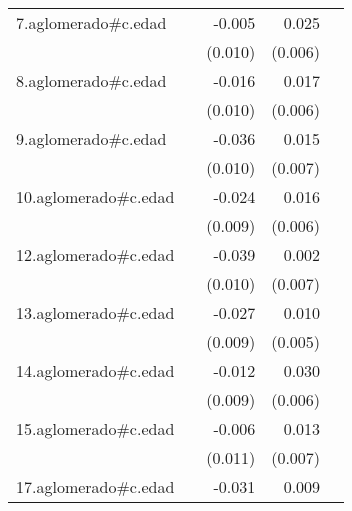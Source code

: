 {\begin{longtable}{l*{4}{D{.}{.}{-1}}}
\addlinespace
7.aglomerado#c.edad&                     &      -0.005         &       0.025\sym{***}&                     \\
            &                     &     (0.010)         &     (0.006)         &                     \\
\addlinespace
8.aglomerado#c.edad&                     &      -0.016         &       0.017\sym{**} &                     \\
            &                     &     (0.010)         &     (0.006)         &                     \\
\addlinespace
9.aglomerado#c.edad&                     &      -0.036\sym{***}&       0.015\sym{*}  &                     \\
            &                     &     (0.010)         &     (0.007)         &                     \\
\addlinespace
10.aglomerado#c.edad&                     &      -0.024\sym{**} &       0.016\sym{**} &                     \\
            &                     &     (0.009)         &     (0.006)         &                     \\
\addlinespace
12.aglomerado#c.edad&                     &      -0.039\sym{***}&       0.002         &                     \\
            &                     &     (0.010)         &     (0.007)         &                     \\
\addlinespace
13.aglomerado#c.edad&                     &      -0.027\sym{**} &       0.010\sym{*}  &                     \\
            &                     &     (0.009)         &     (0.005)         &                     \\
\addlinespace
14.aglomerado#c.edad&                     &      -0.012         &       0.030\sym{***}&                     \\
            &                     &     (0.009)         &     (0.006)         &                     \\
\addlinespace
15.aglomerado#c.edad&                     &      -0.006         &       0.013         &                     \\
            &                     &     (0.011)         &     (0.007)         &                     \\
\addlinespace
17.aglomerado#c.edad&                     &      -0.031\sym{**} &       0.009         &                     \\

\end{longtable}}
